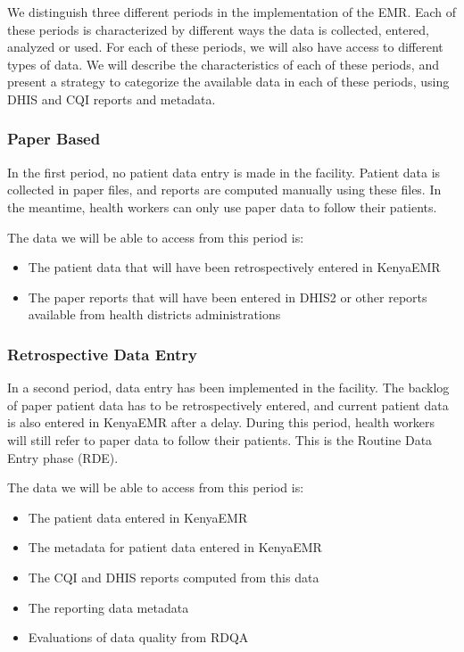 We distinguish three different periods in the implementation of the EMR. Each of these periods is characterized by different ways the data is collected, entered, analyzed or used. For each of these periods, we will also have access to different types of data. We will describe the characteristics of each of these periods, and present a strategy to categorize the available data in each of these periods, using DHIS and CQI reports and metadata.

\subsubsection{Paper Based}

In the first period, no patient data entry is made in the facility. Patient data is collected in paper files, and reports are computed manually using these files. In the meantime, health workers can only use paper data to follow their patients.

The data we will be able to access from this period is:
\begin{itemize}
	\item	The patient data that will have been retrospectively entered in KenyaEMR
	\item	The paper reports that will have been entered in DHIS2 or other reports available from health districts administrations
\end{itemize}

\subsubsection{Retrospective Data Entry}

In a second period, data entry has been implemented in the facility. The backlog of paper patient data has to be retrospectively entered, and current patient data is also entered in KenyaEMR after a delay. During this period, health workers will still refer to paper data to follow their patients. This is the Routine Data Entry phase (RDE).

The data we will be able to access from this period is:
\begin{itemize}
	\item	The patient data entered in KenyaEMR
	\item	The metadata for patient data entered in KenyaEMR
	\item	The CQI and DHIS reports computed from this data
	\item	The reporting data metadata
	\item	Evaluations of data quality from RDQA
\end{itemize}

